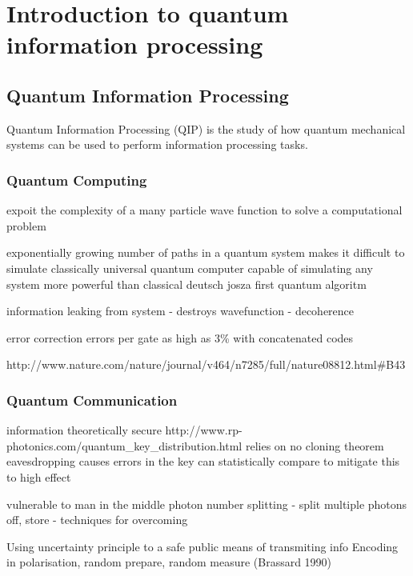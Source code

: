 \chapter{Introduction to quantum information processing} 
\label{ch:Introduction}

\section{Quantum Information Processing}

Quantum Information Processing (QIP) is the study of how quantum mechanical systems can be used to perform information processing tasks. 

\subsection{Quantum Computing}

expoit the complexity of a many particle wave function to solve a computational problem

\cite{feynman_82} exponentially growing number of paths in a quantum system makes it difficult to simulate classically
\cite{deutsch_85} universal quantum computer capable of simulating any system more powerful than classical
\cite{deutsch_jozsa_92} deutsch josza first quantum algoritm

\cite{shors_algorithm}

information leaking from system - destroys wavefunction - decoherence

error correction \cite{knill_correction} errors per gate as high as 3\% with concatenated codes
 
\cite{nature_cq_review_10} http://www.nature.com/nature/journal/v464/n7285/full/nature08812.html#B43

\subsection{Quantum Communication}
information theoretically secure
http://www.rp-photonics.com/quantum_key_distribution.html 
\cite{bennet_brassard_84} relies on no cloning theorem \cite{no_cloning}
eavesdropping causes errors in the key
can statistically compare to mitigate this to high effect

vulnerable to man in the middle
photon number splitting \cite{qkd_number_splitting_attacks_00} - split multiple photons off, store - techniques for overcoming \cite{qkd_decoy_defense}

Using uncertainty principle to a safe public means of transmiting info
Encoding in polarisation, random prepare, random measure (Brassard 1990)

